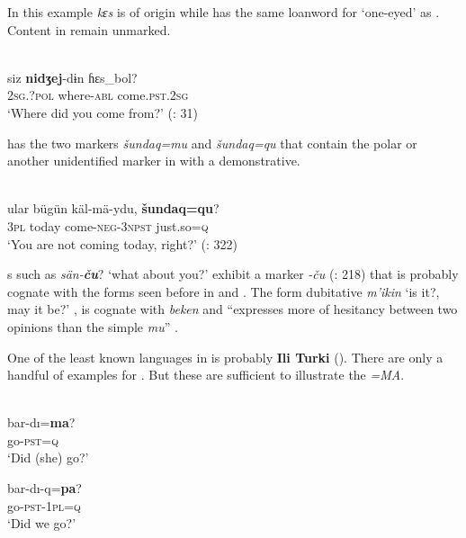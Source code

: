 In this example  \textit{kɛs} is of  origin while  has the same  loanword for ‘one-eyed’ as . Content  in  remain unmarked.

\ea%
    \label{ex:turk:37}
    \\
    \gll siz \textbf{{nidʒej}}-dɨn  ɦɛs\_bol?\\
    2\textsc{sg.?pol}  where-\textsc{abl}  come.\textsc{pst.2sg}\\
    \glt ‘Where did you come from?’ (\citealt{Hayasi1999}: 31)
    \z

 has the two  markers \textit{šundaq=mu} and \textit{šundaq=qu} that contain the polar  or another unidentified marker in  with a demonstrative.

\ea%
    \label{ex:turk:38}
    \\
    \gll ular  bügün  käl-mä-ydu, \textbf{{šundaq=qu}}?\\
    3\textsc{pl}  today  come-\textsc{neg}-3\textsc{npst}  just.so=\textsc{q}\\
    \glt ‘You are not coming today, right?’ (\citealt{TuohutiLitifu2012}: 322)
    \z

s such as \textit{sän-}\textbf{\textit{ču}}? ‘what about you?’ exhibit a marker \textit{-ču} (\citealt{TuohutiLitifu2012}: 218) that is probably cognate with the forms seen before in  and . The form dubitative \textit{m’ikin} ‘is it?, may it be?’ \citep[81]{Shaw1878}, is cognate with  \textit{beken} and “expresses more of hesitancy between two opinions than the simple \textit{mu}” \citep[56]{Shaw1878}.

One of the least known  languages in  is probably \textbf{Ili Turki} (\citealt{ZhaoAximu1985}). There are only a handful of examples for . But these are sufficient to illustrate the  \textit{=MA}.

\ea%
    \label{ex:turk:39}
    \\
    \ea
    \gll bar-dı=\textbf{{ma}}?\\
    go-\textsc{pst}=\textsc{q}\\
    \glt ‘Did (she) go?’
    
    \ex
    \gll bar-dı-q=\textbf{{pa}}?\\
    go-\textsc{pst}-1\textsc{pl}=\textsc{q}\\
    \glt ‘Did we go?’ \citep[31]{Hahn1991}
    \z
    \z

